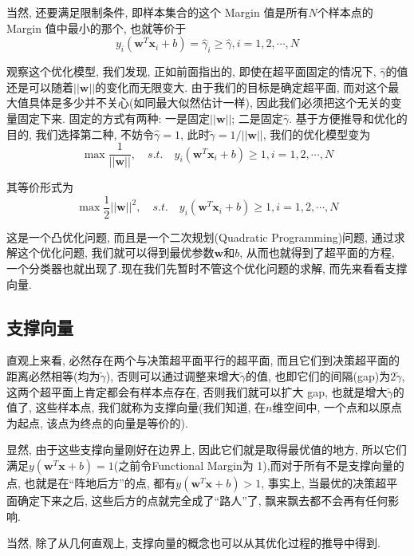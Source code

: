 \documentclass[a4paper,UTF8]{ctexart}
\theoremstyle{plain} \newtheorem{theorem}{定理}[section]
\theoremstyle{plain} \newtheorem{definition}{定义}[section]
\theoremstyle{plain} \newtheorem{lemma}{引理}[section]
\theoremstyle{plain} \newtheorem{proposition}{命题}[section]
\theoremstyle{plain} \newtheorem{example}{例}
\theoremstyle{plain} \newtheorem{remark}{注}
\theoremstyle{plain} \newtheorem{corollary}{推论}[section]
\begin{document}
当然, 还要满足限制条件, 即样本集合的这个 Margin 值是所有$N$个样本点的 Margin 值中最小的那个, 也就等价于
\begin{equation*}
y_{i} (\bm{w}^{T} \bm{x}_{i} + b) = \hat{\gamma}_{i} \geqslant \hat{\gamma} , i = 1,2,\cdots,N
\end{equation*}

观察这个优化模型, 我们发现, 正如前面指出的, 即使在超平面固定的情况下, $\hat{\gamma}$的值还是可以随着$||\bm{w}||$的变化而无限变大. 由于我们的目标是确定超平面, 而对这个最大值具体是多少并不关心(如同最大似然估计一样), 因此我们必须把这个无关的变量固定下来. 固定的方式有两种: 一是固定$||\bm{w}||$; 二是固定$\hat{\gamma}$. 基于方便推导和优化的目的, 我们选择第二种, 不妨令$\hat{\gamma} = 1$, 此时$\tilde{\gamma} = 1 / ||\bm{w}||$, 我们的优化模型变为
\begin{equation*}
\max \frac{1}{||\bm{w}||}, \quad s.t. \quad y_{i} (\bm{w}^{T} \bm{x}_{i} + b) \geqslant 1, i = 1,2,\cdots,N
\end{equation*}

其等价形式为
\begin{equation*}
\max \frac{1}{2} ||\bm{w}||^{2}, \quad s.t. \quad y_{i} (\bm{w}^{T} \bm{x}_{i} + b) \geqslant 1, i = 1,2,\cdots,N
\end{equation*}


这是一个凸优化问题, 而且是一个二次规划(Quadratic Programming)问题, 通过求解这个优化问题, 我们就可以得到最优参数$\bm{w}$和$b$, 从而也就得到了超平面的方程, 一个分类器也就出现了.现在我们先暂时不管这个优化问题的求解, 而先来看看支撑向量.


\subsection{支撑向量}
直观上来看, 必然存在两个与决策超平面平行的超平面, 而且它们到决策超平面的距离必然相等(均为$\tilde{\gamma}$), 否则可以通过调整来增大$\tilde{\gamma}$的值, 也即它们的间隔(gap)为$2 \tilde{\gamma}$, 这两个超平面上肯定都会有样本点存在, 否则我们就可以扩大 gap, 也就是增大$\tilde{\gamma}$的值了, 这些样本点, 我们就称为支撑向量(我们知道, 在$n$维空间中, 一个点和以原点为起点, 该点为终点的向量是等价的).

显然, 由于这些支撑向量刚好在边界上, 因此它们就是取得最优值的地方, 所以它们满足$y(\bm{w}^{T} \bm{x} + b) = 1$(之前令Functional Margin为 1),而对于所有不是支撑向量的点, 也就是在“阵地后方”的点, 都有$y(\bm{w}^{T} \bm{x} + b) > 1$, 事实上, 当最优的决策超平面确定下来之后, 这些后方的点就完全成了“路人”了, 飘来飘去都不会再有任何影响.

当然, 除了从几何直观上, 支撑向量的概念也可以从其优化过程的推导中得到.
\end{document}
